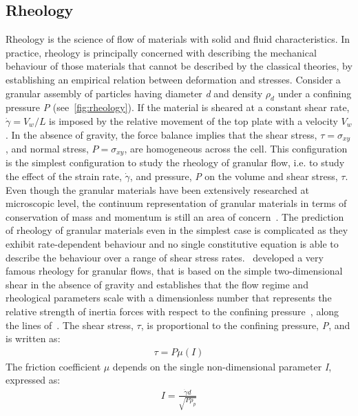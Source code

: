 \subsection{Rheology}
Rheology is the science of flow of materials with solid and fluid 
characteristics. In practice, rheology is principally concerned with describing 
the mechanical behaviour of those materials that cannot be described by the 
classical theories, by establishing an empirical relation between deformation 
and stresses. Consider a granular assembly of particles having diameter 
\textit{d} and density $\rho_{\textit{d}}$ under a confining pressure 
\textit{P} (see~\cref{fig:rheology}). If the material is sheared at a 
constant shear rate, $\dot{\gamma} = \textit{V}_{\textit{w}} / \textit{L}$ is 
imposed by the relative movement of the top plate with a velocity $ 
\textit{V}_{\textit{w}}$. In the absence of gravity, the force balance implies 
that the shear stress, $\tau= \sigma_{\textit{xy}}$, and normal stress, 
$\textit{P}=\sigma_{\textit{xy}}$, are homogeneous across the cell. This 
configuration is the simplest configuration to study the rheology of granular 
flow, i.e. to study the effect of the strain rate, $\dot{\gamma}$, and 
pressure, \textit{P} on the volume and shear stress, $\tau$. Even though the 
granular materials have been extensively researched at microscopic level, the 
continuum representation of granular materials in terms of conservation of mass 
and momentum is still an area of concern~\citep{Midi2004,Daniel2007}. The 
prediction of rheology of granular materials even in the simplest case is 
complicated as they exhibit rate-dependent behaviour and no single constitutive 
equation is able to describe the behaviour over a range of shear stress 
rates.~\citet{DaCruz2005} developed a very famous rheology for granular flows, 
that is based on the simple two-dimensional shear in the absence of gravity and 
establishes that the flow regime and rheological parameters scale with a 
dimensionless number that represents the relative strength of inertia forces 
with respect to the confining pressure~\citep{Daniel2007}, along the lines 
of~\citet{Savage1991}. The shear stress, $\tau$, is proportional to the 
confining pressure, \textit{P}, and is written as:
\begin{align}
\tau = \textit{P} \mu (\textit{I})
\end{align}
The friction coefficient $\mu$ depends on the single non-dimensional parameter 
\textit{I}, expressed as:
\begin{align}
\textit{I} = \frac{\dot{\gamma}d}{\sqrt{\textit{P}\rho_{\textit{p}}}}
\end{align}
